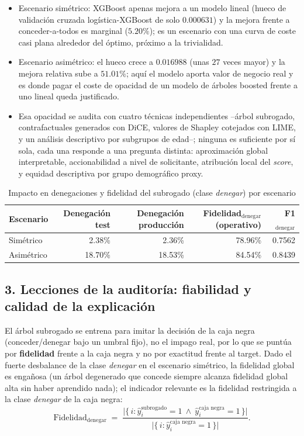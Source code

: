 \documentclass[11pt,a4paper]{article}
\begin{document}
\begin{itemize}
\item Escenario sim\'etrico: XGBoost apenas mejora a un modelo lineal (hueco de validaci\'on cruzada
log\'istica-XGBoost de solo $0.000631$) y la mejora frente a conceder-a-todos es marginal ($5.20\%$); es un
escenario con una curva de coste casi plana alrededor del \'optimo, pr\'oximo a la trivialidad.
\item Escenario asim\'etrico: el hueco crece a $0.016988$ (unas $27$ veces mayor) y la mejora relativa sube
a $51.01\%$; aqu\'i el modelo aporta valor de negocio real y es donde pagar el coste de opacidad de un
modelo de \'arboles boosted frente a uno lineal queda justificado.
\item Esa opacidad se audita con cuatro t\'ecnicas independientes --\'arbol subrogado, contrafactuales
generados con DiCE, valores de Shapley cotejados con LIME, y un an\'alisis descriptivo por subgrupos de
edad--; ninguna es suficiente por s\'i sola, cada una responde a una pregunta distinta: aproximaci\'on
global interpretable, accionabilidad a nivel de solicitante, atribuci\'on local del \emph{score}, y equidad
descriptiva por grupo demogr\'afico proxy.
\end{itemize}

\begin{table}[H]
\centering
\caption{Impacto en denegaciones y fidelidad del subrogado (clase \emph{denegar}) por escenario}
\label{tab:reflexion-auditoria}
\begin{tabular}{lrrrr}
\toprule
Escenario & Denegaci\'on test & Denegaci\'on producci\'on & Fidelidad$_{\text{denegar}}$ (operativo) & F1$_{\text{denegar}}$ \\
\midrule
Sim\'etrico  & 2.38\%  & 2.36\%  & 78.96\% & 0.7562 \\
Asim\'etrico & 18.70\% & 18.53\% & 84.54\% & 0.8439 \\
\bottomrule
\end{tabular}
\end{table}

\subsection*{3. Lecciones de la auditor\'ia: fiabilidad y calidad de la explicaci\'on}

El \'arbol subrogado se entrena para imitar la decisi\'on de la caja negra (conceder/denegar bajo un
umbral fijo), no el impago real, por lo que se punt\'ua por \textbf{fidelidad} frente a la caja negra y no
por exactitud frente al target. Dado el fuerte desbalance de la clase \emph{denegar} en el escenario
sim\'etrico, la fidelidad global es enga\~nosa (un \'arbol degenerado que concede siempre alcanza fidelidad
global alta sin haber aprendido nada); el indicador relevante es la fidelidad restringida a la clase
\emph{denegar} de la caja negra:
\[
\text{Fidelidad}_{\text{denegar}} \;=\;
\frac{\big|\{\, i : \hat{y}^{\text{subrogado}}_i = 1 \ \wedge\ \hat{y}^{\text{caja negra}}_i = 1 \,\}\big|}
     {\big|\{\, i : \hat{y}^{\text{caja negra}}_i = 1 \,\}\big|} .
\]
\end{document}
